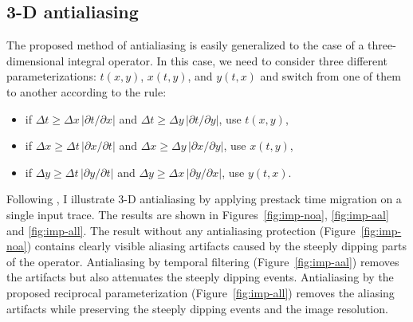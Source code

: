 \begin{comment}
The efficiency of the antialiased migration is compared in the CPU
time chart in Figure \ref{fig:amochp}.  The test data set included 500
by 250 data points with $\Delta t=0.004$ sec, and $\Delta x = 25$ m.
The figure shows that the performance of the reciprocity antialiasing
increases with increase of the migration velocity. This behavior can
be explained by the fact that high-velocity migration hyperbolas
require a smaller number of expensive computations in the steep
(aliased) parts. It allows us to expect a high performance of the
method in application to the curvilinear operators with limited
aperture (dip moveout, azimuth moveout, shot continuation).

\end{comment}

\subsection{3-D antialiasing}

The proposed method of antialiasing is easily generalized to the case
of a three-dimensional integral operator. In this case, we need to
consider three different parameterizations: $t(x,y)$, $x(t,y)$, and
$y(t,x)$ and switch from one of them to another according to the rule:
\begin{itemize}
\item if $\Delta t \geq {{\Delta x} \, {|\partial t / \partial x|}}$
and      $\Delta t \geq {{\Delta y} \, {|\partial t / \partial y|}}$,
use $t(x,y)$,
\item if $\Delta x \geq {{\Delta t} \, {|\partial x / \partial t|}}$
and      $\Delta x \geq {{\Delta y} \, {|\partial x / \partial y|}}$,
use $x(t,y)$,
\item if $\Delta y \geq {{\Delta t} \, {|\partial y / \partial t|}}$
and      $\Delta y \geq {{\Delta x} \, {|\partial y / \partial x|}}$,
use $y(t,x)$.
\end{itemize}

Following , I illustrate 3-D
antialiasing by applying prestack time migration on a single input
trace. The results are shown in Figures~\ref{fig:imp-noa},
\ref{fig:imp-aal} and \ref{fig:imp-all}. The result without any
antialiasing protection (Figure~\ref{fig:imp-noa}) contains clearly
visible aliasing artifacts caused by the steeply dipping parts of the
operator. Antialiasing by temporal filtering
(Figure~\ref{fig:imp-aal}) removes the artifacts but also attenuates
the steeply dipping events. Antialiasing by the proposed reciprocal
parameterization (Figure~\ref{fig:imp-all}) removes the aliasing
artifacts while preserving the steeply dipping events and the image
resolution.

